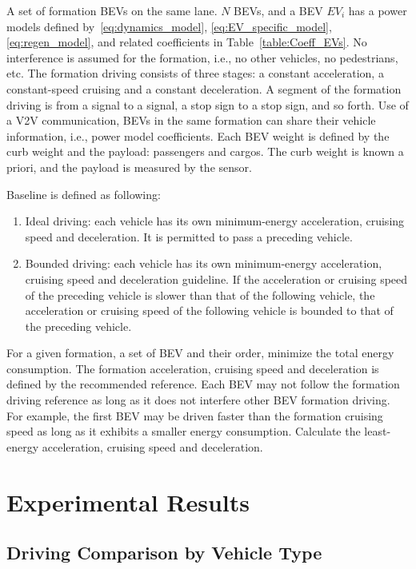 \documentclass{IEEEtran}
\begin{document}
A set of formation BEVs on the same lane. $N$ BEVs, and a BEV $EV_i$ has a power models defined by~\eqref{eq:dynamics_model}, \eqref{eq:EV_specific_model}, \eqref{eq:regen_model}, and related coefficients in Table~\ref{table:Coeff_EVs}.
No interference is assumed for the formation, i.e., no other vehicles, no pedestrians, etc.
The formation driving consists of three stages: a constant acceleration, a constant-speed cruising and a constant deceleration.
A segment of the formation driving is from a signal to a signal, a stop sign to a stop sign, and so forth.
Use of a V2V communication, BEVs in the same formation can share their vehicle information, i.e., power model coefficients.
Each BEV weight is defined by the curb weight and the payload: passengers and cargos. The curb weight is known a priori, and the payload is measured by the sensor. 

Baseline is defined as following:
\begin{enumerate}
\item Ideal driving: each vehicle has its own minimum-energy acceleration, cruising speed and deceleration. 
It is permitted to pass a preceding vehicle.
\item Bounded driving: each vehicle has its own minimum-energy acceleration, cruising speed and deceleration guideline. If the acceleration or cruising speed of the preceding vehicle is slower than that of the following vehicle, the acceleration or cruising speed of the following vehicle is bounded to that of the preceding vehicle.
\end{enumerate}

For a given formation, a set of BEV and their order, minimize the total energy consumption.
The formation acceleration, cruising speed and deceleration is defined by the recommended reference. Each BEV may not follow the formation driving reference as long as it does not interfere other BEV formation driving. For example, the first BEV may be driven faster than the formation cruising speed as long as it exhibits a smaller energy consumption.
Calculate the least-energy acceleration, cruising speed and deceleration.

\section{Experimental Results}\label{sec:exp}

\subsection{Driving Comparison by Vehicle Type}
\end{document}

